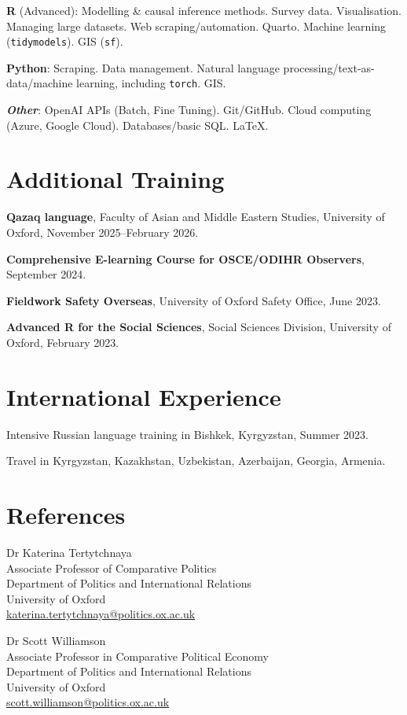 \documentclass[11pt, a4paper]{article}
\begin{document}
\textbf{R} (Advanced): Modelling \& causal inference methods. Survey data. Visualisation. Managing large datasets. Web scraping/automation. Quarto. Machine learning (\texttt{tidymodels}). GIS (\texttt{sf}).

\textbf{Python}: Scraping. Data management. Natural language processing/\allowbreak text-as-data/\allowbreak machine learning, including \texttt{torch}. GIS.

\textbf{\textit{Other}}: OpenAI APIs (Batch, Fine Tuning). Git/GitHub. Cloud computing (Azure, Google Cloud). Databases/\allowbreak basic SQL. \LaTeX.

\section{Additional Training}

\textbf{Qazaq language}, Faculty of Asian and Middle Eastern Studies, University of Oxford, November 2025--February 2026.

\textbf{Comprehensive E-learning Course for OSCE/ODIHR Observers}, September 2024.

\textbf{Fieldwork Safety Overseas}, University of Oxford Safety Office, June 2023.

\textbf{Advanced R for the Social Sciences}, Social Sciences Division, University of Oxford, February 2023.

\section{International Experience}

Intensive Russian language training in Bishkek, Kyrgyzstan, Summer 2023.

Travel in Kyrgyzstan, Kazakhstan, Uzbekistan, Azerbaijan, Georgia, Armenia.

\section{References}

\noindent
\begin{minipage}[t]{0.47\textwidth}\raggedright
  Dr Katerina Tertytchnaya\\
  Associate Professor of Comparative Politics\\
  Department of Politics and International Relations\\
  University of Oxford\\
  \url{katerina.tertytchnaya@politics.ox.ac.uk}
\end{minipage}\hfill
\begin{minipage}[t]{0.47\textwidth}\raggedright
  Dr Scott Williamson\\
  Associate Professor in Comparative Political Economy\\
  Department of Politics and International Relations\\
  University of Oxford\\
  \url{scott.williamson@politics.ox.ac.uk}
\end{minipage}
\end{document}
